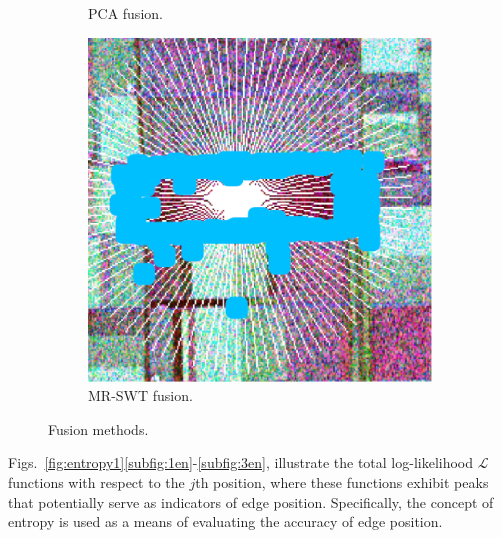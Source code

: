 \documentclass{article}
\begin{document}
\begin{figure}[hbt]
\begin{subfigure}{0.33\linewidth}
    \caption{PCA fusion.}
    \label{subfig:2fus}
  \end{subfigure}
  \begin{subfigure}{0.32\linewidth}
    \centering
    \includegraphics[width=\linewidth]{figures/swt.pdf}
    \caption{MR-SWT fusion.}
    \label{subfig:3fus}
  \end{subfigure}
  \caption{Fusion methods.}
  \label{fig:all-fus}
\end{figure}
Figs.~\ref{fig:entropy1}\ref{subfig:1en}-\ref{subfig:3en}, illustrate the total log-likelihood $\mathcal L$ functions with respect to the $j$th position, where these functions exhibit peaks that potentially serve as indicators of edge position. Specifically, the concept of entropy is used as a means of evaluating the accuracy of edge position.
\end{document}
